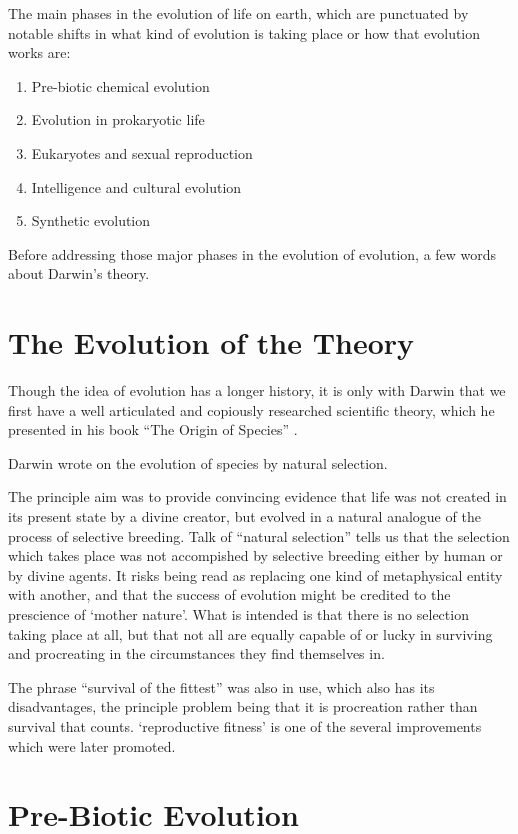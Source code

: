 {The main phases in the evolution of life on earth, which are punctuated by notable shifts in what kind of evolution is taking place or how that evolution works are:

\begin{enumerate}
\item  Pre-biotic chemical evolution
\item  Evolution in prokaryotic life
\item  Eukaryotes and sexual reproduction
\item  Intelligence and cultural evolution
\item  Synthetic evolution
\end{enumerate}

Before addressing those major phases in the evolution of evolution, a few words about Darwin's theory.

\section{The Evolution of the Theory}

Though the idea of evolution has a longer history, it is only with Darwin that we first have a well articulated and copiously researched scientific theory, which he presented in his book ``The Origin of Species'' \cite{darwin-oos}. 

Darwin wrote on the evolution of species by natural selection.

The principle aim was to provide convincing evidence that life was not created in its present state by a divine creator, but evolved in a natural analogue of the process of selective breeding.
Talk of ``natural selection'' tells us that the selection which takes place was not accompished by selective breeding either by human or by divine agents.
It risks being read as replacing one kind of metaphysical entity with another, and that the success of evolution might be credited to the prescience of `mother nature'.
What is intended is that there is no selection taking place at all, but that not all are equally capable of or lucky in surviving and procreating in the circumstances they find themselves in.

The phrase ``survival of the fittest'' was also in use, which also has its disadvantages, the principle problem being that it is procreation rather than survival that counts.
`reproductive fitness' is one of the several improvements which were later promoted.

\section{Pre-Biotic Evolution}

}
